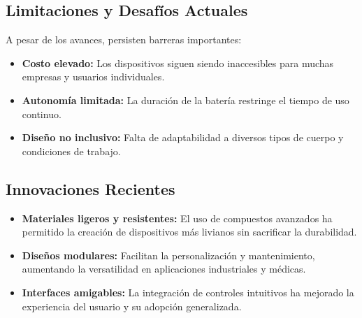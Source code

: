 \subsection*{Limitaciones y Desafíos Actuales}
A pesar de los avances, persisten barreras importantes:
\begin{itemize}
    \item \textbf{Costo elevado:} Los dispositivos siguen siendo inaccesibles para muchas empresas y usuarios individuales.
    \item \textbf{Autonomía limitada:} La duración de la batería restringe el tiempo de uso continuo.
    \item \textbf{Diseño no inclusivo:} Falta de adaptabilidad a diversos tipos de cuerpo y condiciones de trabajo.
\end{itemize}

\subsection*{Innovaciones Recientes}
\begin{itemize}
    \item \textbf{Materiales ligeros y resistentes:} El uso de compuestos avanzados ha permitido la creación de dispositivos más livianos sin sacrificar la durabilidad.
    \item \textbf{Diseños modulares:} Facilitan la personalización y mantenimiento, aumentando la versatilidad en aplicaciones industriales y médicas.
    \item \textbf{Interfaces amigables:} La integración de controles intuitivos ha mejorado la experiencia del usuario y su adopción generalizada.
\end{itemize}
